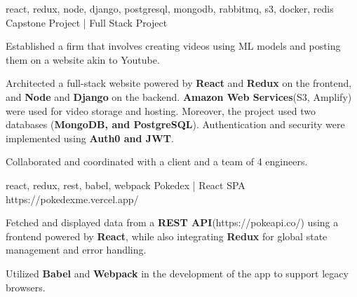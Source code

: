 


\begin{cventries}



  \cventry
    {react, redux, node, django, postgresql, mongodb, rabbitmq, s3, docker, redis } %
    {Capstone Project | Full Stack Project}  %
    {} %
    {} 
    { 
      \begin{cvitems} %
        \item {Established a firm that involves creating videos using ML models and posting them on a website akin to Youtube.} 
        \item {Architected a full-stack website powered by \textbf{React} and \textbf{Redux}  on the frontend, and \textbf{Node} and \textbf{Django} on the backend. \textbf{Amazon Web Services}(S3, Amplify) were used for video storage and hosting. Moreover, the project used two databases (\textbf{MongoDB, and PostgreSQL}). Authentication and security were implemented using \textbf{Auth0 and JWT}.}    
        \item {Collaborated and coordinated with a client and a team of 4 engineers.} 
      \end{cvitems}
    }

  \cventry
    {react, redux, rest, babel, webpack} %
    {Pokedex | React SPA}  %
    {https://pokedexme.vercel.app/} %
    {} 
    {
      \begin{cvitems} %
        \item {Fetched and displayed data from a \textbf{REST API}(https://pokeapi.co/) using a frontend powered by \textbf{React}, while also integrating \textbf{Redux}  for global state management and error handling.}   
        \item {Utilized \textbf{Babel} and \textbf{Webpack}  in the development of the app to support legacy browsers.}   
      \end{cvitems}
    }


\end{cventries}

